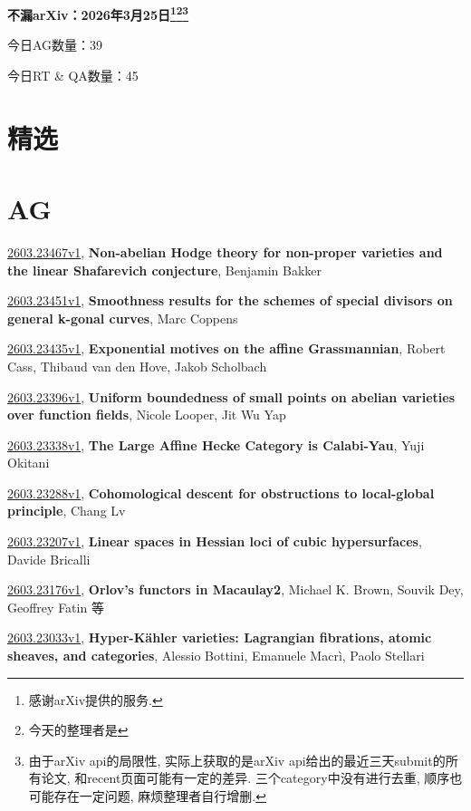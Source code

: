 \documentclass[9pt, a4paper]{article}
\theoremstyle{plain}
\theoremstyle{definition}
\theoremstyle{remark}
\newcommand{\arxiv}[3]{\href{https://arxiv.org/abs/#1}{#1}, \textbf{\textcolor{arxivblue}{#2}}, #3}
\newcommand{\AGnumber}{39}
\newcommand{\RTQAnumber}{45}
\newcommand{\NewestDate}{2026年3月25日}
\newcommand{\todayarXiver}{} %
\begin{document}
\begin{center}
    \Huge\textbf{不漏arXiv：\NewestDate\footnote{感谢arXiv提供的服务.}\footnote{今天的整理者是\todayarXiver}\footnote{由于arXiv api的局限性, 实际上获取的是arXiv api给出的最近三天submit的所有论文, 和recent页面可能有一定的差异. 三个category中没有进行去重, 顺序也可能存在一定问题, 麻烦整理者自行增删.}} \\
\end{center}

\setcounter{section}{-1}

\begin{center}
    今日AG数量：\AGnumber
    
    今日RT \& QA数量：\RTQAnumber
    
\end{center}


\section{精选}


\section{AG}
\arxiv{2603.23467v1}{Non-abelian Hodge theory for non-proper varieties and the linear Shafarevich conjecture}{Benjamin Bakker}

\arxiv{2603.23451v1}{Smoothness results for the schemes of special divisors on general k-gonal curves}{Marc Coppens}

\arxiv{2603.23435v1}{Exponential motives on the affine Grassmannian}{Robert Cass, Thibaud van den Hove, Jakob Scholbach}

\arxiv{2603.23396v1}{Uniform boundedness of small points on abelian varieties over function fields}{Nicole Looper, Jit Wu Yap}

\arxiv{2603.23338v1}{The Large Affine Hecke Category is Calabi-Yau}{Yuji Okitani}

\arxiv{2603.23288v1}{Cohomological descent for obstructions to local-global principle}{Chang Lv}

\arxiv{2603.23207v1}{Linear spaces in Hessian loci of cubic hypersurfaces}{Davide Bricalli}

\arxiv{2603.23176v1}{Orlov's functors in Macaulay2}{Michael K. Brown, Souvik Dey, Geoffrey Fatin 等}

\arxiv{2603.23033v1}{Hyper-Kähler varieties: Lagrangian fibrations, atomic sheaves, and categories}{Alessio Bottini, Emanuele Macrì, Paolo Stellari}
\end{document}
